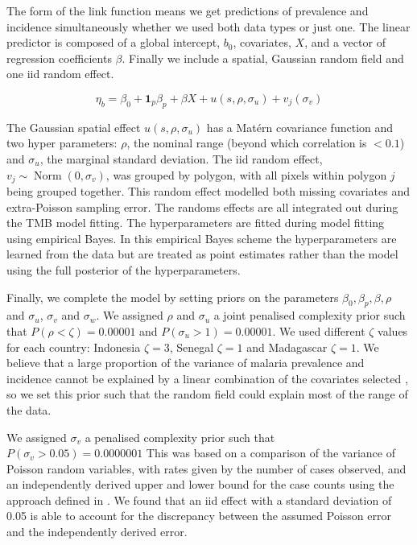\documentclass[10pt,letterpaper]{article}
\begin{document}
The form of the link function means we get predictions of prevalence and incidence simultaneously whether we used both data types or just one.
The linear predictor is composed of a global intercept, $b_0$, covariates, $X$, and a vector of regression coefficients $\beta$.
Finally we include a spatial, Gaussian random field and one iid random effect.

$$\eta_b = \beta_0 + \mathbf{1}_p\beta_p +  \beta X  + u(s, \rho, \sigma_u) + v_j(\sigma_v) $$

The Gaussian spatial effect $u(s, \rho, \sigma_u)$ has a Mat\'ern covariance function and two hyper parameters: $\rho$, the nominal range (beyond which correlation is $< 0.1$) and $\sigma_u$, the marginal standard deviation.
The iid random effect, $v_j \sim \operatorname{Norm}(0, \sigma_v)$,  was grouped by polygon, with all pixels within polygon $j$ being grouped together.
This random effect modelled both missing covariates and extra-Poisson sampling error. 
The randoms effects are all integrated out during the TMB model fitting.
The hyperparameters are fitted during model fitting using empirical Bayes.
In this empirical Bayes scheme the hyperparameters are learned from the data but are treated as point estimates rather than the model using the full posterior of the hyperparameters.



Finally, we complete the model by setting priors on the parameters $\beta_0, \beta_p, \beta, \rho$ and $\sigma_u$, $\sigma_v$ and $\sigma_w$.
We assigned $\rho$ and $\sigma_u$ a joint penalised complexity prior \cite{fuglstad2018constructing} such that $P(\rho < \zeta) = 0.00001$ and $P(\sigma_u > 1) = 0.00001$.
We used different $\zeta$ values for each country: Indonesia $\zeta = 3$, Senegal $\zeta = 1$ and Madagascar $\zeta = 1$.
We believe that a large proportion of the variance of malaria prevalence and incidence cannot be explained by a linear combination of the covariates selected \cite{bhatt2017improved}, so we set this prior such that the random field could explain most of the range of the data.

We assigned $\sigma_v$ a penalised complexity prior \cite{simpson2017penalising} such that $P(\sigma_v > 0.05) = 0.0000001$
This was based on a comparison of the variance of Poisson random variables, with rates given by the number of cases observed, and an independently derived upper and lower bound for the case counts using the approach defined in \cite{cibulskis2011worldwide}.
We found that an iid effect with a standard deviation of 0.05 is able to account for the discrepancy between the assumed Poisson error and the independently derived error.
\end{document}
